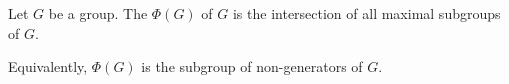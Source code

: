 \documentclass[12pt]{article}
\begin{document}
Let $G$ be a group.  The \emph{} $\Phi (G)$ of $G$ is the intersection of all maximal subgroups of $G$.

Equivalently, $\Phi (G)$ is the subgroup of non-generators of $G$.
\end{document}
